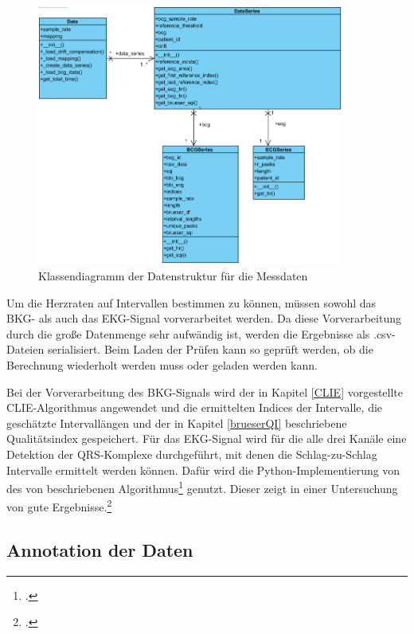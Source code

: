 	\begin{figure}[H]
		\centering
		\includegraphics[width=0.9\textwidth]{pic/data-prep-class.png}
		\caption[Klassendiagramm der Datenstruktur für die Messdaten]{Klassendiagramm der Datenstruktur für die Messdaten}
		\label{fig:data-prep-class}
	\end{figure}
	
	Um die Herzraten auf Intervallen bestimmen zu können, müssen sowohl das \ac{BKG}- als auch das \ac{EKG}-Signal vorverarbeitet werden. Da diese Vorverarbeitung durch die große Datenmenge sehr aufwändig ist, werden die Ergebnisse als .csv-Dateien serialisiert. Beim Laden der Prüfen kann so geprüft werden, ob die Berechnung wiederholt werden muss oder geladen werden kann.
	
	Bei der Vorverarbeitung des \ac{BKG}-Signals wird der in Kapitel \ref{CLIE} vorgestellte CLIE-Algorithmus angewendet und die ermittelten Indices der Intervalle, die geschätzte Intervallängen und der in Kapitel \ref{brueserQI} beschriebene Qualitätsindex gespeichert. Für das \ac{EKG}-Signal wird für die alle drei Kanäle eine Detektion der QRS-Komplexe durchgeführt, mit denen die Schlag-zu-Schlag Intervalle ermittelt werden können. Dafür wird die Python-Implementierung von \citeauthor{Howell2019} des von \citeauthor{Elgendi2010} beschriebenen Algorithmus\footcite[][]{Elgendi2010} genutzt. Dieser zeigt in einer Untersuchung von \citeauthor{Porr2019} gute Ergebnisse.\footcite[Vgl.][]{Porr2019}
	
	
	\subsection{Annotation der Daten}\label{annotation}
	
